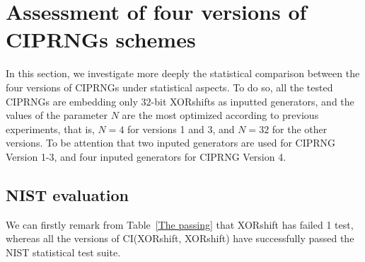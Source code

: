 

\section{Assessment of four versions of CIPRNGs schemes}

In this section, we investigate more deeply 
the statistical comparison between the four 
versions of CIPRNGs under statistical aspects. 
To do so, all the tested CIPRNGs are embedding 
only $32$-bit XORshifts as inputted generators, and the values of the parameter $N$ are the most optimized according to previous experiments,
that is, $N=4$ for versions 1 and 3, and 
$N=32$ for the other versions. To be attention that two inputed generators are used for CIPRNG Version 1-3, and four inputed generators for CIPRNG Version 4.

\subsection{NIST evaluation}

We can firstly remark from Table~\ref{The passing} that XORshift has failed 1 test, whereas all
the versions of CI(XORshift, XORshift) have successfully passed the NIST statistical test suite. %

